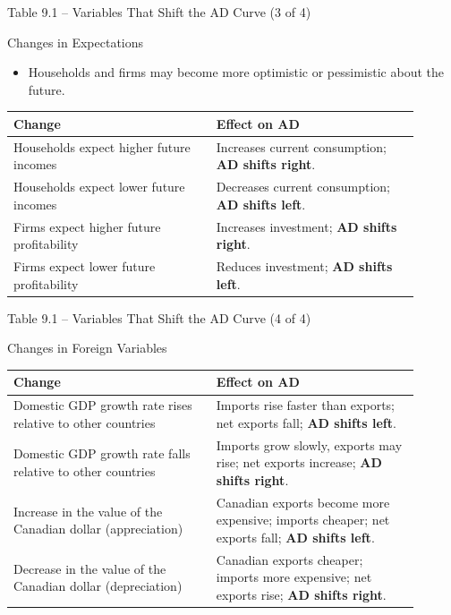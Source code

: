 \documentclass[aspectratio=169]{beamer}
\begin{document}
\begin{frame}{Table 9.1 -- Variables That Shift the AD Curve (3 of 4)}
\transfade
\begin{block}{Changes in Expectations}
\end{block}
\begin{itemize}
  \item Households and firms may become more optimistic or pessimistic about the future.
\end{itemize}
\begin{table}[h]
\centering
\begin{tabular}{p{0.45\linewidth} p{0.45\linewidth}}
\toprule
\textbf{Change} & \textbf{Effect on AD} \\
\midrule
Households expect higher future incomes & Increases current consumption; \textbf{AD shifts right}. \\
Households expect lower future incomes & Decreases current consumption; \textbf{AD shifts left}. \\
Firms expect higher future profitability & Increases investment; \textbf{AD shifts right}. \\
Firms expect lower future profitability & Reduces investment; \textbf{AD shifts left}. \\
\bottomrule
\end{tabular}
\end{table}
\end{frame}

\begin{frame}{Table 9.1 -- Variables That Shift the AD Curve (4 of 4)}
\transfade
\begin{block}{Changes in Foreign Variables}
\end{block}
\begin{table}[h]
\centering
\begin{tabular}{p{0.45\linewidth} p{0.45\linewidth}}
\toprule
\textbf{Change} & \textbf{Effect on AD} \\
\midrule
Domestic GDP growth rate rises relative to other countries & Imports rise faster than exports; net exports fall; \textbf{AD shifts left}. \\
Domestic GDP growth rate falls relative to other countries & Imports grow slowly, exports may rise; net exports increase; \textbf{AD shifts right}. \\
Increase in the value of the Canadian dollar (appreciation) & Canadian exports become more expensive; imports cheaper; net exports fall; \textbf{AD shifts left}. \\
Decrease in the value of the Canadian dollar (depreciation) & Canadian exports cheaper; imports more expensive; net exports rise; \textbf{AD shifts right}. \\
\bottomrule
\end{tabular}
\end{table}
\end{frame}
\end{document}
